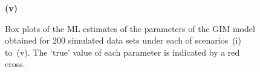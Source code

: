 \documentclass[11pt]{article}
\begin{document}
\begin{figure}[!p]
\vspace*{-0.85cm}
\textbf{(v)}\par\smallskip
{}\vspace*{-0.5cm}
\caption{Box plots of the ML estimates of the parameters of the GIM model obtained for 200 simulated data sets under each of scenarios~(i) to~(v). 
The `true' value of each parameter is indicated by a red cross.
 }
\label{boxplots}
\end{figure}
\restoregeometry

\end{document}
